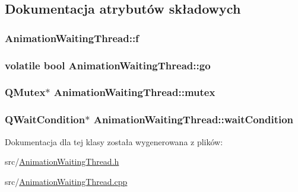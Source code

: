 \subsection{Dokumentacja atrybutów składowych}
\hypertarget{class_animation_waiting_thread_a63562f5dea2e199512e37979f3d5ccae}{
\subsubsection[{f}]{ Animation\-Waiting\-Thread\-::f\hspace{0.3cm}{\ttfamily [private]}}}\label{class_animation_waiting_thread_a63562f5dea2e199512e37979f3d5ccae}
\hypertarget{class_animation_waiting_thread_a51ffa401c81a925e068af99919940994}{
\subsubsection[{go}]{\setlength{\rightskip}{0pt plus 5cm}volatile bool Animation\-Waiting\-Thread\-::go\hspace{0.3cm}{\ttfamily [private]}}}\label{class_animation_waiting_thread_a51ffa401c81a925e068af99919940994}
\hypertarget{class_animation_waiting_thread_ad6c84d789d5d43eed9729e7d4a2d26e4}{
\subsubsection[{mutex}]{\setlength{\rightskip}{0pt plus 5cm}Q\-Mutex$\ast$ Animation\-Waiting\-Thread\-::mutex\hspace{0.3cm}{\ttfamily [private]}}}\label{class_animation_waiting_thread_ad6c84d789d5d43eed9729e7d4a2d26e4}
\hypertarget{class_animation_waiting_thread_aa9a37309d858623088bec9599fbcf135}{
\subsubsection[{wait\-Condition}]{\setlength{\rightskip}{0pt plus 5cm}Q\-Wait\-Condition$\ast$ Animation\-Waiting\-Thread\-::wait\-Condition\hspace{0.3cm}{\ttfamily [private]}}}\label{class_animation_waiting_thread_aa9a37309d858623088bec9599fbcf135}


Dokumentacja dla tej klasy została wygenerowana z plików\-:\begin{DoxyCompactItemize}
\item 
src/\hyperlink{_animation_waiting_thread_8h}{Animation\-Waiting\-Thread.\-h}\item 
src/\hyperlink{_animation_waiting_thread_8cpp}{Animation\-Waiting\-Thread.\-cpp}\end{DoxyCompactItemize}
